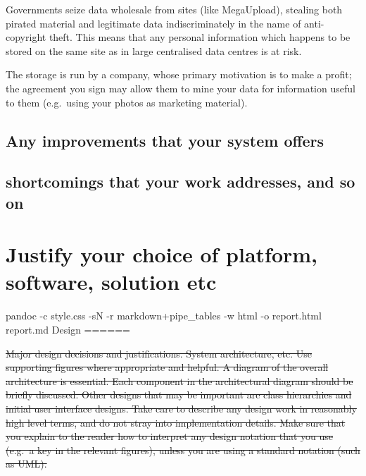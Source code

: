 \documentclass[12pt,a4paper,]{adreport}
\begin{document}
Governments seize data wholesale from sites (like MegaUpload), stealing
both pirated material and legitimate data indiscriminately in the name
of anti-copyright theft. This means that any personal information which
happens to be stored on the same site as in large centralised data
centres is at risk.

The storage is run by a company, whose primary motivation is to make a
profit; the agreement you sign may allow them to mine your data for
information useful to them (e.g.~using your photos as marketing
material).

\subsection{Any improvements that your system
offers}\label{any-improvements-that-your-system-offers}

\subsection{shortcomings that your work addresses, and so
on}\label{shortcomings-that-your-work-addresses-and-so-on}

\section{Justify your choice of platform, software, solution
etc}\label{justify-your-choice-of-platform-software-solution-etc}

pandoc -c style.css -sN -r markdown+pipe\_tables -w html -o report.html
report.md Design ======

\sout{Major design decisions and justifications. System architecture,
etc. Use supporting figures where appropriate and helpful. A diagram of
the overall architecture is essential. Each component in the
architectural diagram should be briefly discussed. Other designs that
may be important are class hierarchies and initial user interface
designs. Take care to describe any design work in reasonably high level
terms, and do not stray into implementation details. Make sure that you
explain to the reader how to interpret any design notation that you use
(e.g.~a key in the relevant figures), unless you are using a standard
notation (such as UML).}
\end{document}
